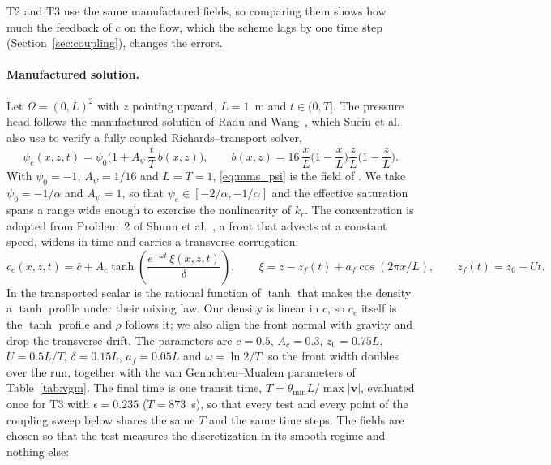 T2 and T3 use the same manufactured fields, so comparing them shows how much
the feedback of $c$ on the flow, which the scheme lags by one time step
(Section~\ref{sec:coupling}), changes the errors.

\paragraph{Manufactured solution.}
Let $\Omega=(0,L)^2$ with $z$ pointing upward, $L=1$~m and $t\in(0,T]$. The
pressure head follows the manufactured solution of Radu and
Wang~\cite{radu2014}, which Suciu et al.~\cite{suciu2021} also use to verify a
fully coupled Richards--transport solver,
\begin{equation}
  \psi_e(x,z,t) = \psi_0\Big(1 + A_\psi\,\frac{t}{T}\,b(x,z)\Big),
  \qquad b(x,z) = 16\,\frac{x}{L}\Big(1-\frac{x}{L}\Big)\frac{z}{L}\Big(1-\frac{z}{L}\Big).
  \label{eq:mms_psi}
\end{equation}
With $\psi_0=-1$, $A_\psi=1/16$ and $L=T=1$, \eqref{eq:mms_psi} is the field of
\cite{radu2014,suciu2021}. We take $\psi_0=-1/\alpha$ and $A_\psi=1$, so that
$\psi_e\in[-2/\alpha,-1/\alpha]$ and the effective saturation spans a range wide
enough to exercise the nonlinearity of $k_r$. The concentration is adapted from
Problem~2 of Shunn et al.~\cite{shunn2012}, a front that advects at a constant
speed, widens in time and carries a transverse corrugation:
\begin{equation}
  c_e(x,z,t) = \bar c + A_c \tanh\!\left(\frac{e^{-\omega t}\,\xi(x,z,t)}{\delta}\right),
  \qquad
  \xi = z - z_f(t) + a_f\cos(2\pi x/L),
  \qquad z_f(t) = z_0 - U t.
  \label{eq:mms_c}
\end{equation}
In \cite{shunn2012} the transported scalar is the rational function of
$\tanh$ that makes the density a $\tanh$ profile under their mixing law. Our
density is linear in $c$, so $c_e$ itself is the $\tanh$ profile and $\rho$
follows it; we also align the front normal with gravity and drop the
transverse drift. The parameters are $\bar c=0.5$, $A_c=0.3$, $z_0=0.75L$,
$U=0.5L/T$, $\delta=0.15L$, $a_f=0.05L$ and $\omega=\ln 2/T$, so the front
width doubles over the run, together with the van Genuchten--Mualem parameters
of Table~\ref{tab:vgm}. The final time is one transit time,
$T=\theta_{\min}L/\max|\mathbf{v}|$, evaluated once for T3 with
$\epsilon=0.235$ ($T=873$~s), so that every test and every point of the
coupling sweep below shares the same $T$ and the same time steps.
The fields are chosen so that the test measures the discretization in its
smooth regime and nothing else:
